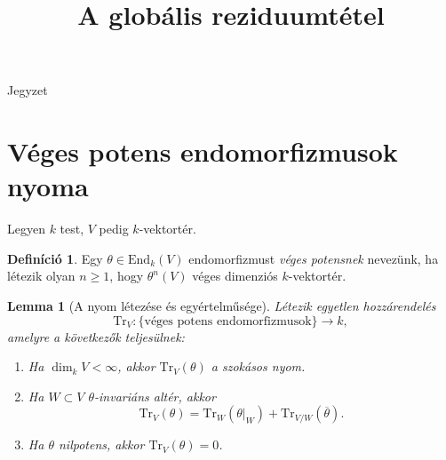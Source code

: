 \documentclass[a4paper,12pt]{article}
\theoremstyle{definition}
\newtheorem{definition}{Definíció}[section]
\theoremstyle{plain}
\newtheorem{lemma}[theorem]{Lemma}
\theoremstyle{remark}
\newcommand{\End}{\mathrm{End}}
\newcommand{\Tr}{\mathrm{Tr}}
\begin{document}
\title{A globális reziduumtétel}
\date{}
\maketitle
\begin{center}
{\Large Jegyzet}
\end{center}

\section{Véges potens endomorfizmusok nyoma}

Legyen $k$ test, $V$ pedig $k$-vektortér.

\begin{definition}
Egy $\theta\in \End_k(V)$ endomorfizmust \emph{véges potensnek} nevezünk, ha létezik olyan $n\ge 1$, hogy $\theta^n(V)$ véges dimenziós $k$-vektortér.
\end{definition}

\begin{lemma}[A nyom létezése és egyértelműsége]
\label{lem:trace}
Létezik egyetlen hozzárendelés
\[
\Tr_V : \{\text{véges potens endomorfizmusok}\}\longrightarrow k,
\]
amelyre a következők teljesülnek:
\begin{enumerate}
\item[(T1)] Ha $\dim_k V<\infty$, akkor $\Tr_V(\theta)$ a szokásos nyom.
\item[(T2)] Ha $W\subset V$ $\theta$-invariáns altér, akkor
\[
\Tr_V(\theta)=\Tr_W(\theta|_W)+\Tr_{V/W}(\overline{\theta}).
\]
\item[(T3)] Ha $\theta$ nilpotens, akkor $\Tr_V(\theta)=0$.
\end{enumerate}
\end{lemma}
\end{document}
